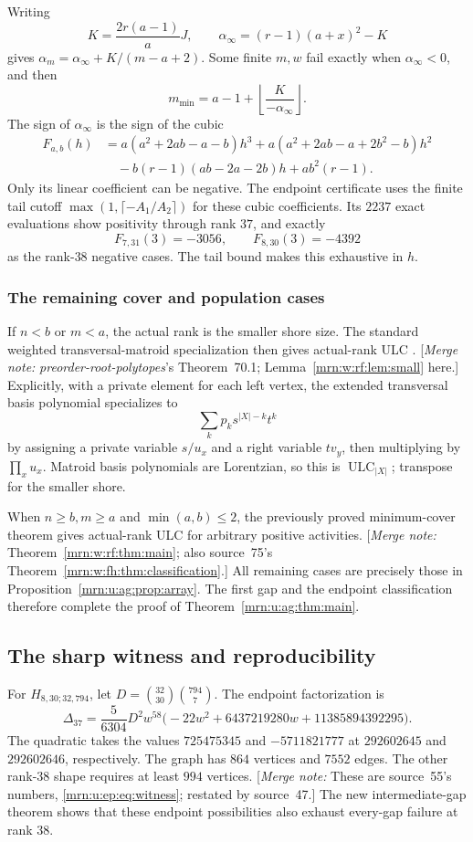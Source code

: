 \documentclass[11pt,a4paper]{article}
\theoremstyle{remark}\newtheorem{remark}[theorem]{Remark}
\newcommand{\ULC}{\operatorname{ULC}}      %
\newcommand{\mnote}[1]{[\textit{Merge note:} #1]}
\newcommand{\prp}{\emph{preorder-root-polytopes}}
\begin{document}
Writing
\[
 K=\frac{2r(a-1)}aJ,\qquad
 \alpha_\infty=(r-1)(a+x)^2-K
\]
gives $\alpha_m=\alpha_\infty+K/(m-a+2)$. Some finite $m,w$ fail exactly when $\alpha_\infty<0$, and then
\[
 m_{\min}=a-1+\left\lfloor\frac K{-\alpha_\infty}\right\rfloor.
\]
The sign of $\alpha_\infty$ is the sign of the cubic
\begin{align*}
 F_{a,b}(h)
 &=a(a^2+2ab-a-b)h^3
   +a(a^2+2ab-a+2b^2-b)h^2\\
 &\quad-b(r-1)(ab-2a-2b)h+ab^2(r-1).
\end{align*}
Only its linear coefficient can be negative. The endpoint certificate uses the finite tail cutoff $\max(1,\lceil-A_1/A_2\rceil)$ for these cubic coefficients. Its $2237$ exact evaluations show positivity through rank $37$, and exactly
\[
 F_{7,31}(3)=-3056,\qquad F_{8,30}(3)=-4392
\]
as the rank-$38$ negative cases. The tail bound makes this exhaustive in $h$.

\subsubsection{The remaining cover and population cases}
If $n<b$ or $m<a$, the actual rank is the smaller shore size. The standard weighted transversal-matroid specialization then gives actual-rank ULC \cite{b:BH,b:RU}. \mnote{\prp's Theorem~70.1; Lemma~\ref{mrn:w:rf:lem:small} here.} Explicitly, with a private element for each left vertex, the extended transversal basis polynomial specializes to
\[
 \sum_k p_k s^{|X|-k}t^k
\]
by assigning a private variable $s/u_x$ and a right variable $tv_y$, then multiplying by $\prod_xu_x$. Matroid basis polynomials are Lorentzian, so this is $\ULC_{|X|}$; transpose for the smaller shore.

When $n\ge b,m\ge a$ and $\min(a,b)\le2$, the previously proved minimum-cover theorem \cite{b:m74} gives actual-rank ULC for arbitrary positive activities. \mnote{Theorem~\ref{mrn:w:rf:thm:main}; also source~75's Theorem~\ref{mrn:w:fh:thm:classification}.} All remaining cases are precisely those in Proposition~\ref{mrn:u:ag:prop:array}. The first gap and the endpoint classification therefore complete the proof of Theorem~\ref{mrn:u:ag:thm:main}.

\subsection{The sharp witness and reproducibility}
For $H_{8,30;32,794}$, let $D=\binom{32}{30}\binom{794}{7}$. The endpoint factorization is
\[
 \Delta_{37}=\frac5{6304}D^2w^{58}
  \bigl(-22w^2+6437219280w+11385894392295\bigr).
\]
The quadratic takes the values $725475345$ and $-5711821777$ at $292602645$ and $292602646$, respectively. The graph has $864$ vertices and $7552$ edges. The other rank-$38$ shape requires at least $994$ vertices. \mnote{These are source~55's numbers, \eqref{mrn:u:ep:eq:witness}; restated by source~47.} The new intermediate-gap theorem shows that these endpoint possibilities also exhaust every-gap failure at rank $38$.
\end{document}
